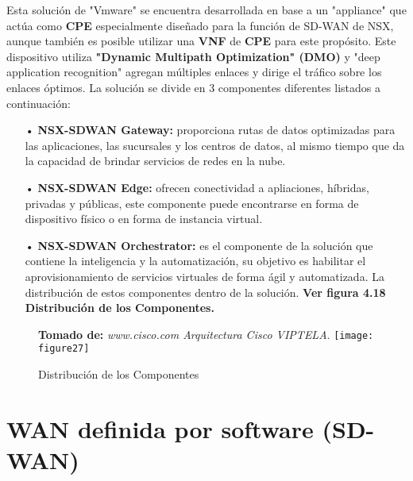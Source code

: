 Esta solución de "Vmware" se encuentra desarrollada en base a un "appliance" que actúa como \textbf{CPE} especialmente diseñado para la función de SD-WAN de NSX, aunque también es posible utilizar una \textbf{VNF} de \textbf{CPE} para este propósito. Este dispositivo utiliza \textbf{"Dynamic Multipath Optimization" (DMO)} y "deep application recognition" agregan múltiples enlaces y dirige el tráfico sobre los enlaces óptimos. La solución se divide en 3 componentes diferentes listados a continuación:
\begin{itemize}
 
\item[•]\textbf{NSX-SDWAN Gateway:} proporciona rutas de datos optimizadas para las aplicaciones, las sucursales y los centros de datos, al mismo tiempo que da la capacidad de brindar servicios de redes en la nube.
\item[•]\textbf{NSX-SDWAN Edge:} ofrecen conectividad a apliaciones, híbridas, privadas y públicas, este componente puede encontrarse en forma de dispositivo físico o en forma de instancia virtual.
\item[•]\textbf{NSX-SDWAN Orchestrator:} es el componente de la solución que contiene la inteligencia y la automatización, su objetivo es habilitar el aprovisionamiento de servicios virtuales de forma ágil y automatizada. La distribución de estos componentes dentro de la solución.
\textbf{Ver figura 4.18 Distribución de los Componentes.}
\end{itemize}

\begin{figure}[htbp]
 \textbf{Tomado de:} \textit{www.cisco.com Arquitectura Cisco VIPTELA}.
  \centering
    {\texttt{[image: figure27]}}
  \caption{Distribución de los Componentes}
  \label{fig:fig2subfig}
\end{figure}

\section{WAN definida por software (SD-WAN)}
\label{WAN definida por software (SD-WAN)}

